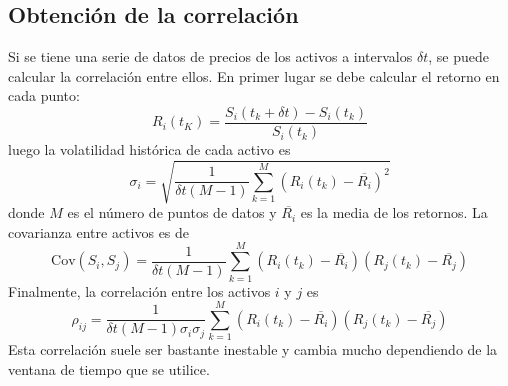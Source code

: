 \subsection{Obtención de la correlación}
Si se tiene una serie de datos de precios de los activos a intervalos $\delta t$, se puede calcular la correlación entre ellos. En primer lugar se debe calcular el retorno en cada punto:
\[
    R_i(t_K) = \frac{S_i(t_k + \delta t) - S_i(t_k)}{S_i(t_k)}
\]
luego la volatilidad histórica de cada activo es
\[
    \sigma_i = \sqrt{ \frac{1}{\delta t (M-1)} \sum_{k=1}^{M} \left( R_i(t_k) - \overline{R_i} \right)^2 }
\]
donde $M$ es el número de puntos de datos y $\overline{R_i}$ es la media de los retornos. La covarianza entre activos es de
\[
    \mathrm{Cov}(S_i, S_j) = \frac{1}{\delta t (M-1)} \sum_{k=1}^{M} \left( R_i(t_k) - \overline{R_i} \right) \left( R_j(t_k) - \overline{R_j} \right)
\]
Finalmente, la correlación entre los activos $i$ y $j$ es
\[
    \boxed{\rho_{ij} = \frac{1}{\delta t (M-1) \sigma_i \sigma_j} \sum_{k=1}^{M} \left( R_i(t_k) - \overline{R_i} \right) \left( R_j(t_k) - \overline{R_j} \right)}
\]
Esta correlación suele ser bastante inestable y cambia mucho dependiendo de la ventana de tiempo que se utilice.





